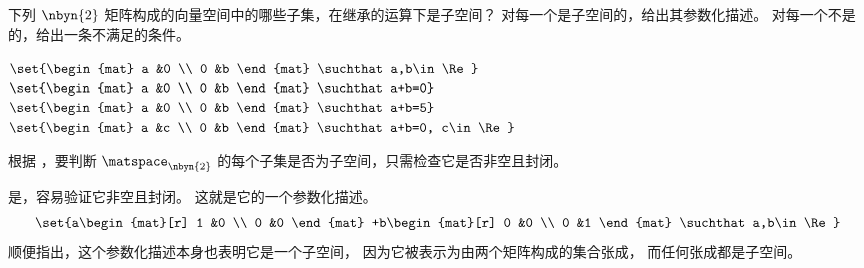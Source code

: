 \begin{exercises}
  \recommended \item
    下列 \( \nbyn{2} \) 矩阵构成的向量空间中的哪些子集，在继承的运算下是子空间？
    对每一个是子空间的，给出其参数化描述。
    对每一个不是的，给出一条不满足的条件。
    \begin{exparts}
      \partsitem \( \set{\begin{mat}
                      a  &0  \\
                      0  &b
                    \end{mat}  \suchthat a,b\in\Re}  \)
      \partsitem \( \set{\begin{mat}
                      a  &0  \\
                      0  &b
                    \end{mat}  \suchthat a+b=0} \)
      \partsitem \( \set{\begin{mat}
                      a  &0  \\
                      0  &b
                    \end{mat}  \suchthat a+b=5} \)
      \partsitem \( \set{\begin{mat}
                      a  &c  \\
                      0  &b
                    \end{mat}  \suchthat a+b=0, c\in\Re} \)
    \end{exparts}
    \begin{answer}
      根据 ，要判断 $\matspace_{\nbyn{2}}$
      的每个子集是否为子空间，只需检查它是否非空且封闭。
      \begin{exparts}
        \partsitem 是，容易验证它非空且封闭。
          这就是它的一个参数化描述。
          \begin{equation*}
            \set{a\begin{mat}[r]
                    1  &0  \\
                    0  &0
                  \end{mat}
                 +b\begin{mat}[r]
                    0  &0  \\
                    0  &1
                   \end{mat}
                 \suchthat a,b\in\Re}
          \end{equation*}
          顺便指出，这个参数化描述本身也表明它是一个子空间，
          因为它被表示为由两个矩阵构成的集合张成，
          而任何张成都是子空间。

\end{exparts}
\end{answer}
\end{exercises}
